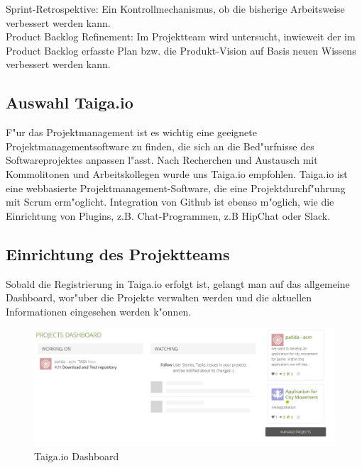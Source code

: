\documentclass[a4paper, 11pt]{scrreprt}
\begin{document}
Sprint-Retrospektive: Ein Kontrollmechanismus, ob die bisherige Arbeitsweise verbessert werden kann.\\

Product Backlog Refinement: Im Projektteam wird untersucht, inwieweit der im Product Backlog erfasste Plan bzw. die Produkt-Vision auf Basis neuen Wissens verbessert werden kann.


\subsection{Auswahl Taiga.io}

F"ur das Projektmanagement ist es wichtig eine geeignete Projektmanagementsoftware zu finden, die sich an die Bed"urfnisse
des Softwareprojektes anpassen l"asst. Nach Recherchen und Austausch mit Kommolitonen und Arbeitskollegen wurde uns Taiga.io empfohlen. Taiga.io ist eine webbasierte Projektmanagement-Software, die eine Projektdurchf"uhrung mit Scrum
erm"oglicht. Integration von Github ist ebenso m"oglich, wie die Einrichtung von Plugins, z.B. Chat-Programmen, z.B HipChat oder Slack.

\subsection{Einrichtung des Projektteams}

Sobald die Registrierung in Taiga.io erfolgt ist, gelangt man auf das allgemeine Dashboard, wor"uber die Projekte verwalten werden und die aktuellen Informationen eingesehen werden k"onnen.\newline

\begin{figure} [H]
\begin{center}


\includegraphics[width=16cm]{dashboard.png}
\caption{Taiga.io Dashboard}

\end{center}
\end{figure}
\end{document}
